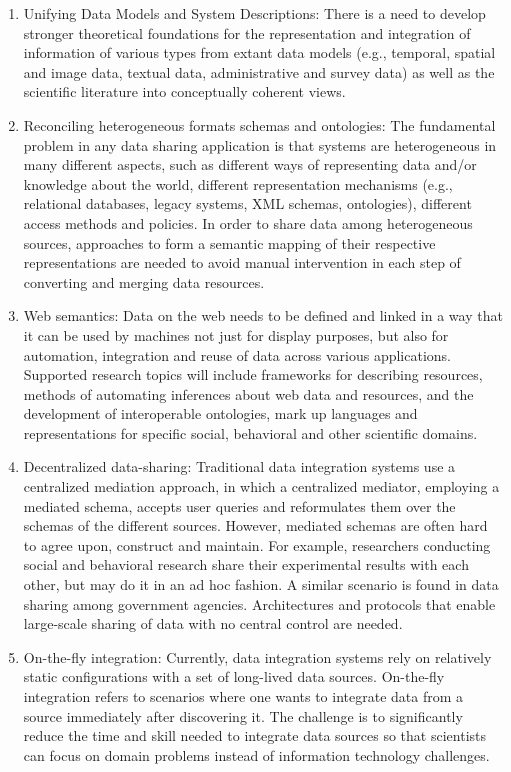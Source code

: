 \begin{enumerate}
\item Unifying Data Models and System Descriptions: There is a need to
develop stronger theoretical foundations for the representation and
integration of information of various types from extant data models (e.g.,
temporal, spatial and image data, textual data, administrative and survey
data) as well as the scientific literature into conceptually coherent
views.

\item Reconciling heterogeneous formats schemas and ontologies: The
fundamental problem in any data sharing application is that systems are
heterogeneous in many different aspects, such as different ways of
representing data and/or knowledge about the world, different
representation mechanisms (e.g., relational databases, legacy systems, XML
schemas, ontologies), different access methods and policies. In order to
share data among heterogeneous sources, approaches to form a semantic
mapping of their respective representations are needed to avoid manual
intervention in each step of converting and merging data resources.

\item Web semantics: Data on the web needs to be defined and linked in a
way that it can be used by machines not just for display purposes, but also
for automation, integration and reuse of data across various
applications. Supported research topics will include frameworks for
describing resources, methods of automating inferences about web data and
resources, and the development of interoperable ontologies, mark up
languages and representations for specific social, behavioral and other
scientific domains.

\item Decentralized data-sharing: Traditional data integration systems use
a centralized mediation approach, in which a centralized mediator,
employing a mediated schema, accepts user queries and reformulates them
over the schemas of the different sources. However, mediated schemas are
often hard to agree upon, construct and maintain. For example, researchers
conducting social and behavioral research share their experimental results
with each other, but may do it in an ad hoc fashion. A similar scenario is
found in data sharing among government agencies. Architectures and
protocols that enable large-scale sharing of data with no central control
are needed.

\item On-the-fly integration: Currently, data integration systems rely on
relatively static configurations with a set of long-lived data
sources. On-the-fly integration refers to scenarios where one wants to
integrate data from a source immediately after discovering it. The
challenge is to significantly reduce the time and skill needed to integrate
data sources so that scientists can focus on domain problems instead of
information technology challenges.

\end{enumerate}

